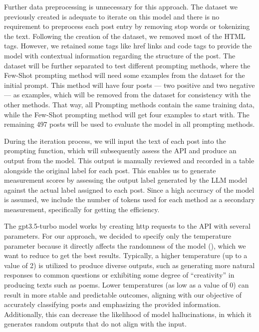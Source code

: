 \documentclass[english,bachelor]{swsLeipzig}
\begin{document}
Further data preprocessing is unnecessary for this approach. The dataset we previously created is adequate to iterate 
on this model and there is no requirement to preprocess each post entry by removing stop words or tokenizing the text. Following the creation of the dataset, we removed most of the HTML tags. However, we retained some tags like href links and code tags to provide the model with contextual information regarding the structure of the post. The dataset will be further separated to test different prompting methods, where the Few-Shot prompting method will need some examples from the dataset for the initial prompt. This method will have four posts --- two positive and two negative --- as examples, which will be removed from the dataset for consistency with the other methods. That way, all Prompting methods contain the same training data, while the Few-Shot prompting method will get four examples to start with. The remaining 497 posts will be used to evaluate the model in all prompting methods.

During the iteration process, we will input the text of each post into the prompting function, which will 
subsequently assess the API and produce an output from the model. This output is manually reviewed and recorded in a table alongside the original label for each post. This enables us to generate measurement scores by assessing the output label generated by the LLM model against the actual label assigned to each post. Since a high accuracy of the model is assumed, we include the number of tokens used for each method as a secondary measurement, specifically for getting the efficiency.

The gpt3.5-turbo model works by creating http requests to the API with several parameters. For our approach, we 
decided to specify only the temperature parameter because it directly affects the randomness of the model (\citeauthor{openaicomplete:2023}), which we want to reduce to get the best results. Typically, a higher temperature (up to a value of 2) is utilized to produce diverse outputs, such as generating more natural responses to common questions or exhibiting some degree of ``creativity'' in producing texts such as poems. Lower temperatures (as low as a value of 0) can result in more stable and predictable outcomes, aligning with our objective of accurately classifying posts and emphasizing the provided information. Additionally, this can decrease the likelihood of model hallucinations, in which it generates random outputs that do not align with the input.
\end{document}
